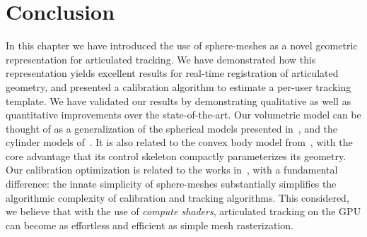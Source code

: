 \section{Conclusion}
\label{sec:conclusion}

In this chapter we have introduced the use of sphere-meshes as a novel geometric representation for articulated tracking. We have demonstrated how this representation yields excellent results for real-time registration of articulated geometry, and presented a calibration algorithm to estimate a per-user tracking template. We have validated our results by demonstrating qualitative as well as quantitative improvements over the state-of-the-art. Our volumetric model can be thought of as a generalization of the spherical models presented in~\cite{sridhar2015fast,qian2014realtime}, and the cylinder models of~\cite{oiko2011hand,tagliasacchi2015robust}. It is also related to the convex body model from~\cite{melax2013dynamics}, with the core advantage that its control skeleton compactly parameterizes its geometry. Our calibration optimization is related to the works in~\cite{taylor2014user,khamis15learning,tan2016fits}, with a fundamental difference: the innate simplicity of sphere-meshes substantially simplifies the algorithmic complexity of calibration and tracking algorithms. This considered, we believe that with the use of \emph{compute shaders}, articulated tracking on the GPU can become as effortless and efficient as simple mesh rasterization.

